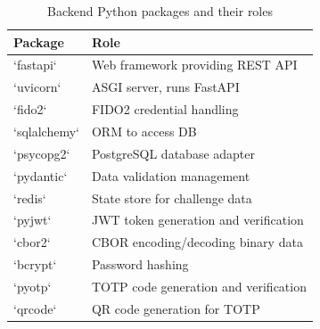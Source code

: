 \begin{table}[htbp]
\centering
\small
\caption{Backend Python packages and their roles}
\label{tab:backend-packages}
\begin{tabular}{p{2.5cm}p{5.5cm}}
  \toprule
  Package & Role \\
  \midrule
  `fastapi` & Web framework providing REST API\\
  `uvicorn` & ASGI server, runs FastAPI\\
  `fido2` & FIDO2 credential handling\\
  `sqlalchemy` & ORM to access DB \\
  `psycopg2` & PostgreSQL database adapter\\
  `pydantic` & Data validation management \\
  `redis` & State store for  challenge data \\
  `pyjwt` & JWT token generation and verification \\
  `cbor2` & CBOR encoding/decoding binary data\\
  `bcrypt` & Password hashing \\
  `pyotp` & TOTP code generation and verification \\
  `qrcode` & QR code generation for TOTP \\
  \bottomrule
\end{tabular}
\end{table}

